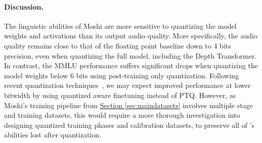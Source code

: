 \paragraph{Discussion.} The linguistic abilities of Moshi are more sensitive to quantizing the model weights and activations than its output audio quality.
More specifically, the audio quality remains close to that of the floating point baseline down to 4 bits precision, even when quantizing the full model, including the Depth Transformer. 
In contrast, the MMLU performance suffers significant drops when quantizing the model weights below 6 bits using post-training only quantization.
Following recent quantization techniques~\citep{quipsharp}, we may expect improved performance at lower bitwidth by using quantized aware finetuning  instead of PTQ. However, as Moshi's training pipeline from \hyperref[sec:maindatasets]{Section \ref{sec:maindatasets}} involves multiple stage and training datasets, this would require a more thorough investigation into designing quantized training phases and calibration datasets, to preserve all of \ours{}'s abilities lost after quantization.





